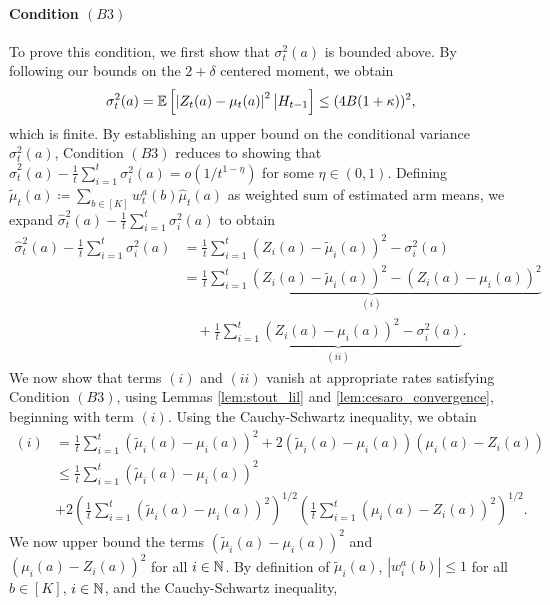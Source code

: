 \documentclass{article}
\begin{document}
\begin{appendices}
\paragraph{Condition $(B3)$} To prove this condition, we first show that $\sigma_t^2(a)$ is bounded above. By following our bounds on the $2+\delta$ centered moment, we obtain
\begin{equation}
    \sigma_t^2(a)  = \mathbb{E}\left[\left|Z_t(a) - \mu_t(a) \right|^{2}  \big| H_{t-1} \right] \leq (4B(1+\kappa))^{2},
\end{equation}
which is finite. By establishing an upper bound on the conditional variance $\sigma_t^2(a)$, Condition $(B3)$ reduces to showing that $\hat\sigma_t^2(a) - \frac{1}{t}\sum_{i=1}^t \sigma^2_i(a) = o(1/t^{1-\eta})$ for some $\eta \in (0,1)$. Defining $\tilde\mu_t(a) \coloneqq \sum_{b \in [K]}w_t^a(b) \hat\mu_t(a)$ as weighted sum of estimated arm means, we expand $\hat\sigma_t^2(a) - \frac{1}{t}\sum_{i=1}^t \sigma^2_i(a)$ to obtain
\begin{align}\label{eq:terms_i_ii}
        \hat\sigma_t^2(a) - \frac{1}{t}\sum_{i=1}^t \sigma_i^2(a) &= \frac{1}{t} \sum_{i=1}^t (Z_i(a) - \tilde\mu_i(a))^2 - \sigma_i^2(a)\\
        &=\underbrace{\frac{1}{t} \sum_{i=1}^t \left(Z_i(a) - \tilde\mu_i(a)\right)^2 - \left(Z_i(a) - \mu_i(a)\right)^2}_{(i)} \label{l:final_i} \\ 
        &\quad+\underbrace{\frac{1}{t} \sum_{i=1}^t(Z_i(a) - \mu_i(a))^2 - \sigma_i^2(a)}_{(ii)}\label{l:final_ii}.
\end{align}
We now show that terms $(i)$ and $(ii)$ vanish at appropriate rates satisfying Condition $(B3)$, using Lemmas \ref{lem:stout_lil} and \ref{lem:cesaro_convergence}, beginning with term $(i)$. Using the Cauchy-Schwartz inequality, we obtain
\begin{align}
    (i) &= \frac{1}{t}\sum_{i=1}^t (\tilde\mu_i(a) - \mu_i(a))^2 + 2(\tilde\mu_i(a) - \mu_i(a))(\mu_i(a) - Z_i(a))\\
    & \leq \frac{1}{t}\sum_{i=1}^t (\tilde\mu_i(a) - \mu_i(a))^2 \\ 
    &+2\left(\frac{1}{t}\sum_{i=1}^t(\tilde\mu_i(a) - \mu_i(a))^2 \right)^{1/2}\left(\frac{1}{t}\sum_{i=1}^t (\mu_i(a) - Z_i(a))^2\right)^{1/2}.
\end{align}
We now upper bound the terms $(\tilde\mu_i(a) - \mu_i(a))^2$ and $(\mu_i(a) - Z_i(a))^2$ for all $i \in \mathbb{N}$. By definition of $\tilde\mu_i(a)$, $|w_i^a(b)| \leq 1$ for all $b \in [K]$, $i \in \mathbb{N}$, and the Cauchy-Schwartz inequality,
\begin{equation}

\end{equation}
\end{appendices}
\end{document}
